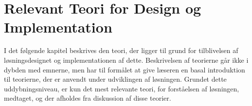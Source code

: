 \chapter{Relevant Teori for Design og Implementation}

I det følgende kapitel beskrives den teori, der ligger til grund for tilblivelsen af løsningsdesignet og implementationen af dette. Beskrivelsen af teorierne går ikke i dybden med emnerne, men har til formålet at give læseren en basal introduktion til teorierne, der er anvendt under udviklingen af løsningen. Grundet dette uddybningsniveau, er kun det mest relevante teori, for forståelsen af løsningen, medtaget, og der afholdes fra diskussion af disse teorier.






